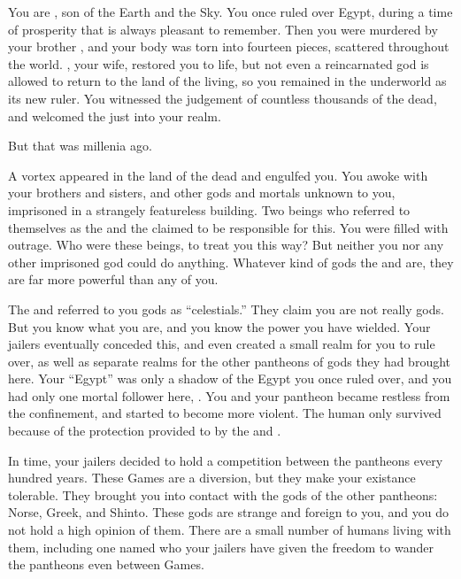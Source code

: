 \documentclass[char]{guardians}
\begin{document}
\name{\cOsiris{}}

You are \cOsiris{}, son of the Earth and the Sky. You once ruled over Egypt, during a time of prosperity that is always pleasant to remember. Then you were murdered by your brother \cSet{}, and your body was torn into fourteen pieces, scattered throughout the world. \cIsis{}, your wife, restored you to life, but not even a reincarnated god is allowed to return to the land of the living, so you remained in the underworld as its new ruler. You witnessed the judgement of countless thousands of the dead, and welcomed the just into your realm.

But that was millenia ago.

A vortex appeared in the land of the dead and engulfed you. You awoke with your brothers and sisters, and other gods and mortals unknown to you, imprisoned in a strangely featureless building. Two beings who referred to themselves as the \cCaretaker{} and the \cWarden{} claimed to be responsible for this. You were filled with outrage. Who were these beings, to treat you this way? But neither you nor any other imprisoned god could do anything. Whatever kind of gods the \cCaretaker{} and \cWarden{} are, they are far more powerful than any of you.

The \cCaretaker{} and \cWarden{} referred to you gods as ``celestials.'' They claim you are not really gods. But you know what you are, and you know the power you have wielded. Your jailers eventually conceded this, and even created a small realm for you to rule over, as well as separate realms for the other pantheons of gods they had brought here. Your ``Egypt'' was only a shadow of the Egypt you once ruled over, and you had only one mortal follower here, \cEgyptianHuman{}. You and your pantheon became restless from the confinement, and started to become more violent. The human \cEgyptianHuman{} only survived because of the protection provided to \cEgyptianHuman{\them} by the \cWarden{} and \cCaretaker{}.

In time, your jailers decided to hold a competition between the pantheons every hundred years. These Games are a diversion, but they make your existance tolerable. They brought you into contact with the gods of the other pantheons: Norse, Greek, and Shinto. These gods are strange and foreign to you, and you do not hold a high opinion of them. There are a small number of humans living with them, including one named \cJascha{} who your jailers have given the freedom to wander the pantheons even between Games.
\end{document}
